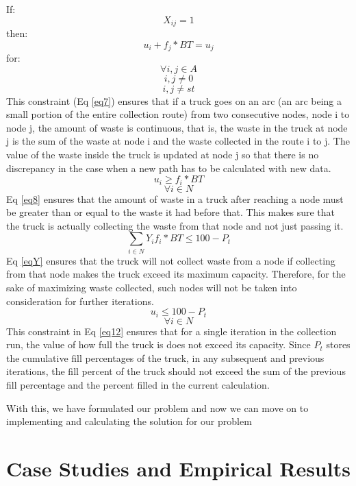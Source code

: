 \documentclass[12pt]{article}
\begin{document}
If:
$$ X_{ij}=1$$
then:
\begin{equation}\label{eq7}
    u_i+f_j*BT =u_j
\end{equation}
for: 
$$ \forall i,j \in A$$
$$ i,j\ne 0$$
$$ i,j \ne st $$
This constraint (Eq \eqref{eq7}) ensures that if a truck goes on an arc (an arc being a small portion of the entire collection route) from two consecutive nodes, node i to node j, the amount of waste is continuous, that is, the waste in the truck at node j is the sum of the waste at node i and the waste collected in the route i to j. The value of the waste inside the truck is updated at node j so that there is no discrepancy in the case when a new path has to be calculated with new data.
\begin{equation}\label{eq8}
    u_i\ge f_i*BT
\end{equation}
$$  \forall i\in N$$
Eq \eqref{eq8} ensures that the amount of waste in a truck after reaching a node must be greater than or equal to the waste it had before that. This makes sure that the truck is actually collecting the waste from that node and not just passing it.
\begin{equation}\label{eqY}
	\sum_{i\in N}Y_i f_i* BT\le100-P_t
\end{equation}
Eq \eqref{eqY} ensures that the truck will not collect waste from a node if collecting from that node makes the truck exceed its maximum capacity. Therefore, for the sake of maximizing waste collected, such nodes will not be taken into consideration for further iterations.
\begin{equation}\label{eq12}
    u_i\le 100 - P_t
\end{equation}
$$\forall i \in N $$
This constraint in Eq \eqref{eq12} ensures that for a single iteration in the collection run, the value of how full the truck is does not exceed its capacity. Since $P_t$ stores the cumulative fill percentages of the truck, in any subsequent and previous iterations, the fill percent of the truck should not exceed the sum of the previous fill percentage and the percent filled in the current calculation. 

With this, we have formulated our problem and now we can move on to implementing and calculating the solution for our problem

\section{Case Studies and Empirical Results}
\end{document}
